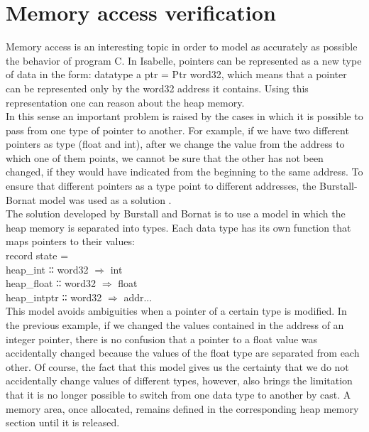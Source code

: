 \documentclass[conference]{IEEEtran}
\begin{document}
\section{Memory access verification}
Memory access is an interesting topic in order to model as accurately as possible the behavior of program C. In Isabelle, pointers can be represented as a new type of data in the form: datatype a ptr = Ptr word32, which means that a pointer can be represented only by the word32 address it contains. Using this representation one can reason about the heap memory.\\
In this sense an important problem is raised by the cases in which it is possible to pass from one type of pointer to another. For example, if we have two different pointers as type (float and int), after we change the value from the address to which one of them points, we cannot be sure that the other has not been changed, if they would have indicated from the beginning to the same address. To ensure that different pointers as a type point to different addresses, the Burstall-Bornat model was used as a solution \cite{burstall}.\\
The solution developed by Burstall and Bornat is to use a model in which the heap memory is separated into types. Each data type has its own function that maps pointers to their values:\\
record state =\\
  heap\_int ∶∶ word32 $ \Rightarrow $ int\\
  heap\_float ∶∶ word32 $ \Rightarrow $ float\\
  heap\_intptr ∶∶ word32 $ \Rightarrow $ addr...\\
This model avoids ambiguities when a pointer of a certain type is modified. In the previous example, if we changed the values contained in the address of an integer pointer, there is no confusion that a pointer to a float value was accidentally changed because the values of the float type are separated from each other. Of course, the fact that this model gives us the certainty that we do not accidentally change values of different types, however, also brings the limitation that it is no longer possible to switch from one data type to another by cast. A memory area, once allocated, remains defined in the corresponding heap memory section until it is released.
\end{document}
